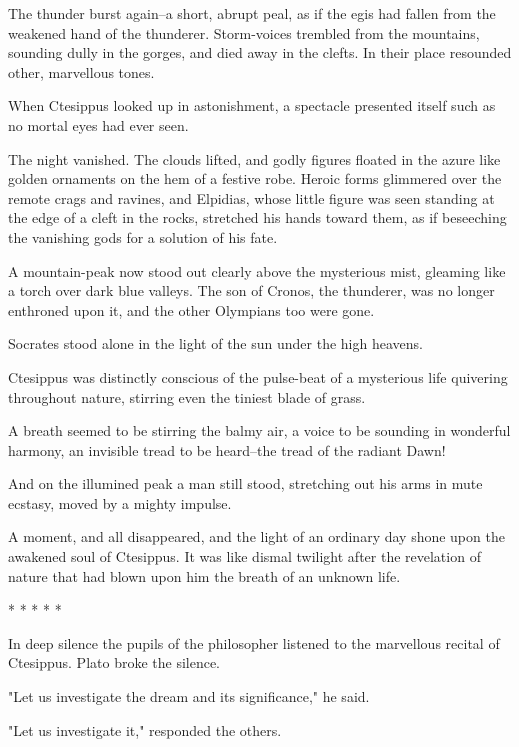 The thunder burst again--a short, abrupt peal, as if the egis had
fallen from the weakened hand of the thunderer. Storm-voices trembled
from the mountains, sounding dully in the gorges, and died away in the
clefts. In their place resounded other, marvellous tones.

When Ctesippus looked up in astonishment, a spectacle presented itself
such as no mortal eyes had ever seen.

The night vanished. The clouds lifted, and godly figures floated in
the azure like golden ornaments on the hem of a festive robe. Heroic
forms glimmered over the remote crags and ravines, and Elpidias, whose
little figure was seen standing at the edge of a cleft in the rocks,
stretched his hands toward them, as if beseeching the vanishing gods
for a solution of his fate.

A mountain-peak now stood out clearly above the mysterious mist,
gleaming like a torch over dark blue valleys. The son of Cronos, the
thunderer, was no longer enthroned upon it, and the other Olympians
too were gone.

Socrates stood alone in the light of the sun under the high heavens.

Ctesippus was distinctly conscious of the pulse-beat of a mysterious
life quivering throughout nature, stirring even the tiniest blade of
grass.

A breath seemed to be stirring the balmy air, a voice to be sounding
in wonderful harmony, an invisible tread to be heard--the tread of the
radiant Dawn!

And on the illumined peak a man still stood, stretching out his arms
in mute ecstasy, moved by a mighty impulse.

A moment, and all disappeared, and the light of an ordinary day shone
upon the awakened soul of Ctesippus. It was like dismal twilight after
the revelation of nature that had blown upon him the breath of an
unknown life.

       *        *        *        *        *

In deep silence the pupils of the philosopher listened to the
marvellous recital of Ctesippus. Plato broke the silence.

"Let us investigate the dream and its significance," he said.

"Let us investigate it," responded the others.
